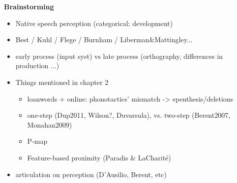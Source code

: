 \textbf{Brainstorming} \\

\begin{itemize}
\item Native speech perception (categorical; development)
\item Best / Kuhl / Flege / Burnham / Liberman\&Mattingley...
\item early process (input syst) vs late process (orthography, differences in production ...)
\item Things mentioned in chapter 2
  \begin{itemize}
  \item loanwords + online: phonotactics' mismatch -> epenthesis/deletions
  \item one-step (Dup2011, Wilson?, Duvarsula), vs. two-step (Berent2007, Monahan2009)
  \item P-map
  \item Feature-based proximity (Paradis \& LaCharité)
  \end{itemize}
\item articulation on perception (D'Ausilio, Berent, etc)
\end{itemize}

